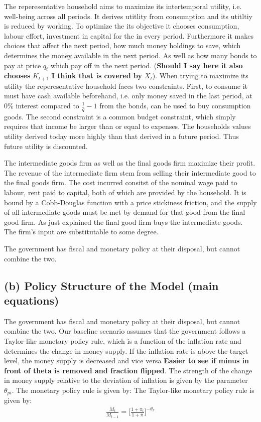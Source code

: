 \documentclass[12pt]{article}
\begin{document}
The reperesentative household aims to maximize its intertemporal utility, i.e. well-being 
across all periods. It derives utitlity from consumption and its utitltiy is reduced by working. To optimize the its objective
it chooses consumption, labour effort, investment in capital for the in every period. %
Furthermore it makes choices that affect the next period,  how much money holdings to save, which determines the money available
in the next period. As well as how many bonds to pay at price $q_t$ which pay off in the next period. (\textbf{Should 
I say here it also chooses} $K_{t+1}$ \textbf{I think that is covered by } $X_t$). When trying to maximize its utility
the reperesentative household faces two constraints. First, to consume it must have cash available beforehand, i.e. only money 
saved in the last period, at 0\% interest compared to $\frac{1}{q} -1$ from the bonds, can be used to buy consumption goods. 
The second constraint is a common budget constraint, which simply requires that income be larger than or equal to expenses. 
The households values utility derived today more highly than that derived in a future period. Thus future utility is discounted. 

The intermediate goods firm as well as the final goods firm maximize their profit. 
The revenue of the intermediate firm stem from selling their intermediate good to the 
final goods firm. The cost incurred consitst of the nominal wage paid to labour, rent paid to capital, both
of which are provided by the household. It is bound by a Cobb-Douglas function with a price stickiness friction, and 
the supply of all intermediate goods must be met by demand for that good from the final good firm. 
As just explained the final good firm buys the intermediate goods. The firm's input are substitutable to some degree. 

The government has fiscal and monetary policy at their disposal, but cannot combine the two. 



\subsection*{(b) Policy Structure of the Model (main equations)}
The government has fiscal and monetary policy at their disposal, but cannot combine the two. Our baseline scenario assumes that the government
follows a Taylor-like monetary policy rule, which is a function of the inflation rate and determines the change in money supply. If the inflation rate is above the target level, the money supply is decreased and vice versa \textbf{Easier to see if minus in front of theta is removed and fraction flipped}. The strength of the change in money supply relative to the deviation of inflation is given by the parameter $\theta_{pi}$. The monetary policy rule is given by:
The Taylor-like monetary policy rule is given by:
\begin{align}
    \frac{M_t}{M_{t-1}} = \biggl[ \frac{1+\pi_t}{1+\bar{\pi}} \biggr]^{-\theta_\pi}
\end{align}
\end{document}
